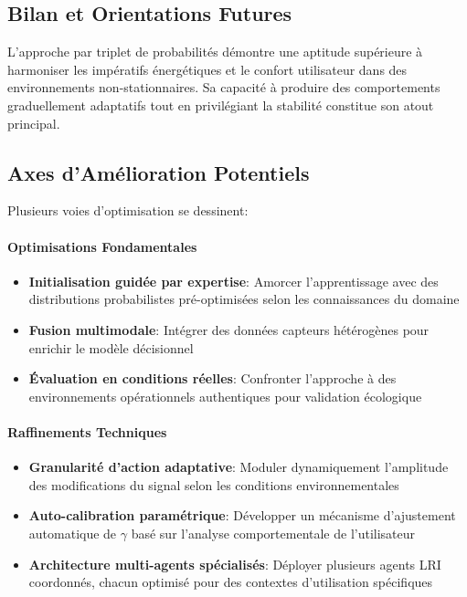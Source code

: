 \documentclass[a4paper,11pt]{article}
\begin{document}
\subsection{Bilan et Orientations Futures}

L'approche par triplet de probabilités démontre une aptitude supérieure à harmoniser les impératifs énergétiques et le confort utilisateur dans des environnements non-stationnaires. Sa capacité à produire des comportements graduellement adaptatifs tout en privilégiant la stabilité constitue son atout principal.

\subsection{Axes d'Amélioration Potentiels}

Plusieurs voies d'optimisation se dessinent:

\paragraph{Optimisations Fondamentales}
\begin{itemize}
    \item \textbf{Initialisation guidée par expertise}: Amorcer l'apprentissage avec des distributions probabilistes pré-optimisées selon les connaissances du domaine
    \item \textbf{Fusion multimodale}: Intégrer des données capteurs hétérogènes pour enrichir le modèle décisionnel
    \item \textbf{Évaluation en conditions réelles}: Confronter l'approche à des environnements opérationnels authentiques pour validation écologique
\end{itemize}

\paragraph{Raffinements Techniques}
\begin{itemize}
    \item \textbf{Granularité d'action adaptative}: Moduler dynamiquement l'amplitude des modifications du signal selon les conditions environnementales
    \item \textbf{Auto-calibration paramétrique}: Développer un mécanisme d'ajustement automatique de $\gamma$ basé sur l'analyse comportementale de l'utilisateur
    \item \textbf{Architecture multi-agents spécialisés}: Déployer plusieurs agents LRI coordonnés, chacun optimisé pour des contextes d'utilisation spécifiques
\end{itemize}
\end{document}
